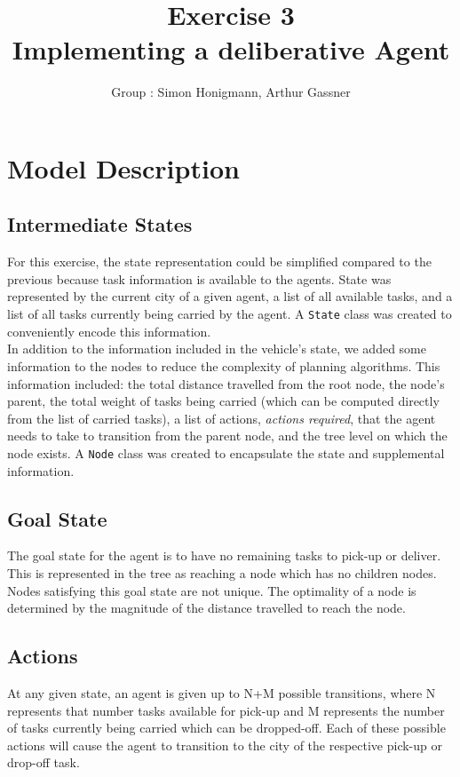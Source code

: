 \documentclass[11pt]{article}
\title{\bf Exercise 3\\ Implementing a deliberative Agent}
\author{Group \textnumero76: Simon Honigmann, Arthur Gassner}
\begin{document}
\maketitle

\section{Model Description}

\subsection{Intermediate States}
For this exercise, the state representation could be simplified compared to the previous because task information is available to the agents. State was represented by the current city of a given agent, a list of all available tasks, and a list of all tasks currently being carried by the agent. A \texttt{State} class was created to conveniently encode this information. \\

In addition to the information included in the vehicle's state, we added some information to the nodes to reduce the complexity of planning algorithms. This information included: the total distance travelled from the root node, the node's parent, the total weight of tasks being carried (which can be computed directly from the list of carried tasks), a list of actions, \textit{actions required}, that the agent needs to take to transition from the parent node, and the tree level on which the node exists. A \texttt{Node} class was created to encapsulate the state and supplemental information. 
\subsection{Goal State}
The goal state for the agent is to have no remaining tasks to pick-up or deliver. This is represented in the tree as reaching a node which has no children nodes. Nodes satisfying this goal state are not unique. The optimality of a node is determined by the magnitude of the distance travelled to reach the node. 

\subsection{Actions}
At any given state, an agent is given up to N+M possible transitions, where N represents that number tasks available for pick-up and M represents the number of tasks currently being carried which can be dropped-off. Each of these possible actions will cause the agent to transition to the city of the respective pick-up or drop-off task.\\
\end{document}
